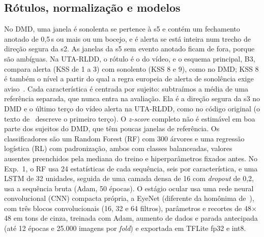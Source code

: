 \documentclass[conference]{IEEEtran}
\begin{document}
\subsection{Rótulos, normalização e modelos}
\label{sec:rotulos}
No DMD, uma janela é sonolenta se pertence à s5 e contém um fechamento anotado de 0,5\,s ou mais ou um bocejo, e é alerta se está inteira num trecho de direção segura da s2. As janelas da s5 sem evento anotado ficam de fora, porque são ambíguas. Na UTA-RLDD, o rótulo é o do vídeo, e o esquema principal, B3, compara alerta (KSS de 1 a 3) com sonolento (KSS 8 e 9), como no DMD; KSS 8 é também o nível a partir do qual a regra europeia de alerta de sonolência exige aviso~\cite{ue2021ddaw}. Cada característica é centrada por sujeito: subtraímos a média de uma referência separada, que nunca entra na avaliação. Ela é a direção segura da s3 no DMD e o último terço do vídeo alerta na UTA-RLDD, como no código original (o texto de~\cite{ghoddoosian2019} descreve o primeiro terço). O \emph{z-score} completo não é estimável em boa parte dos sujeitos do DMD, que têm poucas janelas de referência. Os classificadores são um Random Forest (RF) com 300 árvores e uma regressão logística (RL) com padronização, ambos com classes balanceadas, valores ausentes preenchidos pela mediana do treino e hiperparâmetros fixados antes. No Exp.~1, o RF usa 24 estatísticas de cada sequência, seis por característica, e uma LSTM de 32 unidades, seguida de uma camada densa de 16 com \emph{dropout} de 0,2, usa a sequência bruta (Adam, 50 épocas). O estágio ocular usa uma rede neural convolucional (CNN) compacta própria, a EyeNet (diferente da homônima de~\cite{rahman2020}), com três blocos convolucionais (16, 32 e 64 filtros), \ExpTresParametros{} parâmetros e recortes de 48$\times$48 em tons de cinza, treinada com Adam, aumento de dados e parada antecipada (até 12 épocas e 25.000 imagens por \emph{fold}) e exportada em TFLite fp32 e int8.
\end{document}
